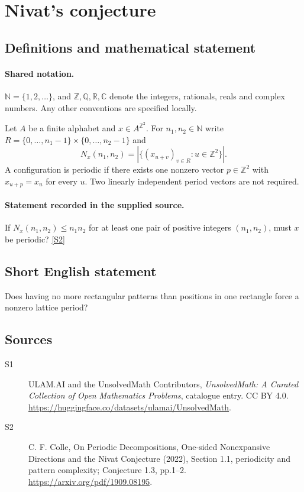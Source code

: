 \documentclass[11pt]{article}
\newcommand{\sref}[2]{\hyperlink{source:#1:#2}{[S#2]}}
\begin{document}
\section{Nivat's conjecture}\label{statement}

\subsection{Definitions and mathematical statement}

\paragraph{Shared notation.}$\mathbb N=\{1,2,\ldots\}$, and $\mathbb Z,\mathbb Q,\mathbb R,\mathbb C$ denote the integers, rationals, reals and complex numbers. Any other conventions are specified locally.


Let $A$ be a finite alphabet and $x\in A^{\mathbb Z^2}$. For $n_1,n_2\in\mathbb N$ write $R=\{0,\ldots,n_1-1\}\times\{0,\ldots,n_2-1\}$ and \[N_x(n_1,n_2)=\left|\{(x_{u+v})_{v\in R}:u\in\mathbb Z^2\}\right|.\] A configuration is periodic if there exists one nonzero vector $p\in\mathbb Z^2$ with $x_{u+p}=x_u$ for every $u$. Two linearly independent period vectors are not required.
\paragraph{Statement recorded in the supplied source.}
If $N_x(n_1,n_2)\le n_1n_2$ for at least one pair of positive integers $(n_1,n_2)$, must $x$ be periodic? \sref{statement}{2}
\subsection{Short English statement}
Does having no more rectangular patterns than positions in one rectangle force a nonzero lattice period?
\subsection{Sources}
\begin{description}
\item[\hypertarget{source:statement:1}{S1}] ULAM.AI and the UnsolvedMath Contributors, \emph{UnsolvedMath: A Curated Collection of Open Mathematics Problems}, catalogue entry. CC BY 4.0. \url{https://huggingface.co/datasets/ulamai/UnsolvedMath}.
\item[\hypertarget{source:statement:2}{S2}] C. F. Colle, On Periodic Decompositions, One-sided Nonexpansive Directions and the Nivat Conjecture (2022), Section 1.1, periodicity and pattern complexity; Conjecture 1.3, pp.1--2. \url{https://arxiv.org/pdf/1909.08195}.
\end{description}
\label{end:statement}
\end{document}
